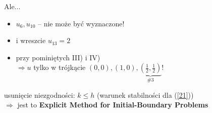 \begin{frame}
\begin{alertblock}{Ale...}
\begin{itemize}
  \item  $u_6, u_{10} $ -- nie może być wyznaczone! 	
\item i wreszcie $u_{13} = 2$
 \item przy pominiętych III) i IV) \\
$\Rightarrow u$ tylko w trójkącie $(0,0), (1,0),\underbrace{\left ( \frac{1}{2}, \frac{1}{2} \right )}_{\#3} ! $
\end{itemize}
 \end{alertblock}

\vspace{6mm}
usunięcie niezgodności: $k \le h$ (warunek stabilności dla (\ref{21})) \\
$\Rightarrow$ jest to \textbf{Explicit Method for Initial-Boundary Problems}
\end{frame}



